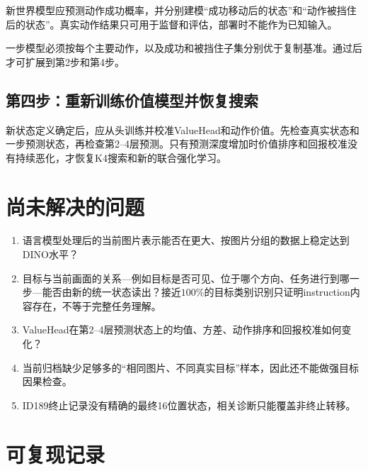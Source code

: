 \documentclass[UTF8,11pt,a4paper,fontset=none]{ctexart}
\begin{document}
新世界模型应预测动作成功概率，并分别建模“成功移动后的状态”和“动作被挡住后的状态”。真实动作结果只可用于监督和评估，部署时不能作为已知输入。

一步模型必须按每个主要动作，以及成功和被挡住子集分别优于复制基准。通过后才可扩展到第2步和第4步。

\subsection{第四步：重新训练价值模型并恢复搜索}

新状态定义确定后，应从头训练并校准ValueHead和动作价值。先检查真实状态和一步预测状态，再检查第2--4层预测。只有预测深度增加时价值排序和回报校准没有持续恶化，才恢复K4搜索和新的联合强化学习。

\section{尚未解决的问题}

\begin{enumerate}
  \item 语言模型处理后的当前图片表示能否在更大、按图片分组的数据上稳定达到DINO水平？
  \item 目标与当前画面的关系---例如目标是否可见、位于哪个方向、任务进行到哪一步---能否由新的统一状态读出？接近$100\%$的目标类别识别只证明instruction内容存在，不等于完整任务理解。
  \item ValueHead在第2--4层预测状态上的均值、方差、动作排序和回报校准如何变化？
  \item 当前归档缺少足够多的“相同图片、不同真实目标”样本，因此还不能做强目标因果检查。
  \item ID189终止记录没有精确的最终16位置状态，相关诊断只能覆盖非终止转移。
\end{enumerate}

\section{可复现记录}
\end{document}
